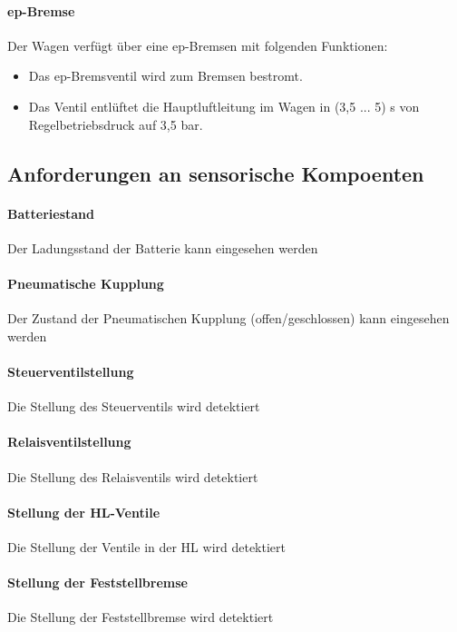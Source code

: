 \paragraph{ep-Bremse}
\begin{feat}
Der Wagen verfügt über eine \gls{ep-Bremsen} mit folgenden Funktionen:
\begin{itemize}
    \item Das ep-Bremsventil wird zum Bremsen bestromt.
    \item Das Ventil entlüftet die Hauptluftleitung im Wagen in (3,5 ... 5) s von Regelbetriebsdruck auf 3,5 bar.
\end{itemize}
\end{feat}


\subsection{Anforderungen an sensorische Kompoenten}

\paragraph{Batteriestand}
Der Ladungsstand der Batterie kann eingesehen werden
\paragraph{Pneumatische Kupplung}
Der Zustand der Pneumatischen Kupplung (offen/geschlossen) kann eingesehen werden
\paragraph{Steuerventilstellung}
Die Stellung des Steuerventils wird detektiert
\paragraph{Relaisventilstellung}
Die Stellung des Relaisventils wird detektiert
\paragraph{Stellung der HL-Ventile}
Die Stellung der Ventile in der HL wird detektiert
\paragraph{Stellung der Feststellbremse}
Die Stellung der Feststellbremse wird detektiert
